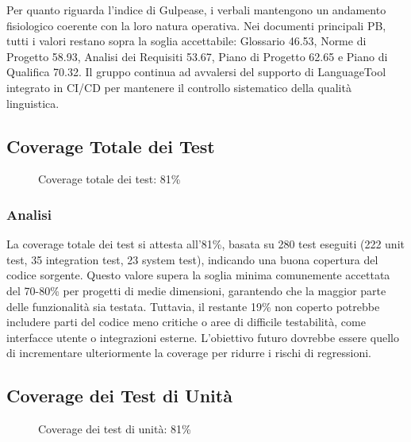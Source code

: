 \documentclass[a4paper,11pt,oneside]{scrartcl}
\begin{document}
Per quanto riguarda l'indice di Gulpease, i verbali mantengono un andamento fisiologico coerente con la loro natura operativa. Nei documenti principali PB, tutti i valori restano sopra la soglia accettabile: Glossario 46.53, Norme di Progetto 58.93, Analisi dei Requisiti 53.67, Piano di Progetto 62.65 e Piano di Qualifica 70.32. Il gruppo continua ad avvalersi del supporto di LanguageTool integrato in CI/CD per mantenere il controllo sistematico della qualità linguistica.

\subsection{Coverage Totale dei Test}

\begin{figure}[H]
    \centering
    \caption{Coverage totale dei test: 81\%}
    \label{fig:coverage_totale}
\end{figure}

\subsubsection*{Analisi}

La coverage totale dei test si attesta all'81\%, basata su 280 test eseguiti (222 unit test, 35 integration test, 23 system test), indicando una buona copertura del codice sorgente. Questo valore supera la soglia minima comunemente accettata del 70-80\% per progetti di medie dimensioni, garantendo che la maggior parte delle funzionalità sia testata. Tuttavia, il restante 19\% non coperto potrebbe includere parti del codice meno critiche o aree di difficile testabilità, come interfacce utente o integrazioni esterne. L'obiettivo futuro dovrebbe essere quello di incrementare ulteriormente la coverage per ridurre i rischi di regressioni.

\subsection{Coverage dei Test di Unità}

\begin{figure}[H]
    \centering
    \caption{Coverage dei test di unità: 81\%}
    \label{fig:coverage_unita}
\end{figure}
\end{document}
